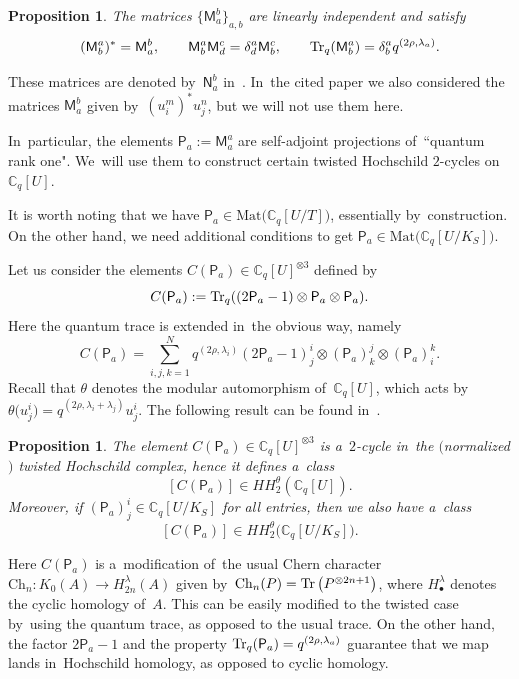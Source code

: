 \documentclass[pdftex]{sigma}
\numberwithin{equation}{section}
\newtheorem{Proposition}[Theorem]{Proposition}
 { \theoremstyle{definition}
\newtheorem{Definition}[Theorem]{Definition}
\newtheorem{Note}[Theorem]{Note}
\newtheorem{Example}[Theorem]{Example}
\newtheorem{Remark}[Theorem]{Remark} }
\newcommand{\CqU}{\mathbb{C}_q[U]}
\newcommand{\Cqflag}{\mathbb{C}_q[U / K_S]}
\newcommand{\Cqfullflag}{\mathbb{C}_q[U /T]}
\newcommand{\matuni}{\mathsf{M}}
\newcommand{\proj}{\mathsf{P}}
\begin{document}
\begin{Proposition}
\label{prop:matrix-units}
The matrices $\big\{\matuni^b_a\big\}_{a, b}$ are linearly independent and satisfy
\[
(\matuni^a_b)^* = \matuni^b_a, \qquad
\matuni^a_b \matuni^c_d = \delta^a_d \matuni^c_b, \qquad
\mathop{\rm Tr}\nolimits_q(\matuni^a_b) = \delta^a_b q^{(2 \rho, \lambda_a)}.
\]
\end{Proposition}

\begin{Remark}
These matrices are denoted by~$\mathsf{N}^b_a$ in~\cite{twist-hoch}.
In~the cited paper we also considered the matrices $\mathsf{M}^b_a$ given by~$(u^m_i)^* u^n_j$, but we will not use them here.
\end{Remark}

In~particular, the elements $\proj_a := \matuni^a_a$ are self-adjoint projections of~``quantum rank one".
We~will use them to construct certain twisted Hoch\-schild $2$-cycles on $\CqU$.

\begin{Remark}
It is worth noting that we have $\proj_a \in \mathrm{Mat}\big(\Cqfullflag\big)$, essentially by~construction.
On the other hand, we need additional conditions to get $\proj_a \in \mathrm{Mat}\big(\Cqflag\big)$.
\end{Remark}

Let us consider the elements $C(\proj_a) \in \CqU^{\otimes 3}$ defined by
\[
C(\proj_a) := \mathop{\rm Tr}\nolimits_q((2 \proj_a - 1) \otimes \proj_a \otimes \proj_a).
\]
Here the quantum trace is extended in~the obvious way, namely
\[
C(\proj_a) = \sum_{i, j, k = 1}^N q^{(2 \rho, \lambda_i)} (2 \proj_a - 1)^i_j \otimes (\proj_a)^j_k \otimes (\proj_a)^k_i.
\]
Recall that $\theta$ denotes the modular automorphism of~$\CqU$, which acts by~$\theta\big(u^i_j\big) = q^{(2 \rho, \lambda_i + \lambda_j)} u^i_j$.
The following result can be found in~\cite[Proposition~5.1]{twist-hoch}.

\begin{Proposition}
\label{prop:hoch-classes}
The element $C(\proj_a) \in \CqU^{\otimes 3}$ is a~$2$-cycle in~the $($normalized$)$ twisted Hoch\-schild complex, hence it defines a~class
\[
[C(\proj_a)] \in HH^\theta_2(\CqU).
\]
Moreover, if $(\proj_a)^i_j \in \Cqflag$ for all entries, then we also have a~class
\[
[C(\proj_a)] \in HH^\theta_2\big(\Cqflag\big).
\]
\end{Proposition}

\begin{Remark}
Here $C(\proj_a)$ is a~modification of~the usual Chern character $\mathrm{Ch}_n\colon K_0(A) \to H^\lambda_{2 n}(A)$ given by~$\mathrm{Ch}_n(P) = \mathop{\rm Tr}\big(P^{\otimes 2 n + 1}\big)$, where $H^\lambda_\bullet$ denotes the cyclic homology of~$A$.
This can be easily modified to the twisted case by~using the quantum trace, as opposed to the usual trace.
On the other hand, the factor $2 \proj_a - 1$ and the property $\mathop{\rm Tr}\nolimits_q(\proj_a) = q^{(2 \rho, \lambda_a)}$ guarantee that we map lands in~Hoch\-schild homology, as opposed to cyclic homology.
\end{Remark}
\end{document}
